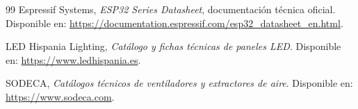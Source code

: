 \begin{thebibliography}{99}
Espressif Systems,
\emph{ESP32 Series Datasheet},
documentación técnica oficial.
Disponible en:
\url{https://documentation.espressif.com/esp32_datasheet_en.html}.


LED Hispania Lighting,
\emph{Catálogo y fichas técnicas de paneles LED}.
Disponible en:
\url{https://www.ledhispania.es}.

SODECA,
\emph{Catálogos técnicos de ventiladores y extractores de aire}.
Disponible en:
\url{https://www.sodeca.com}.


\end{thebibliography}
